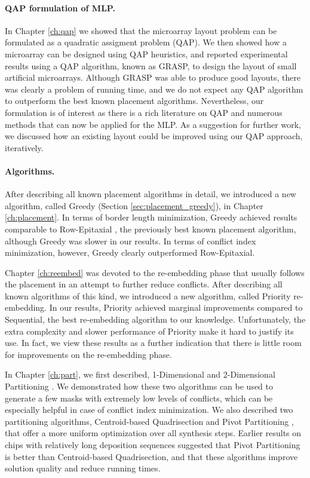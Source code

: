\paragraph{QAP formulation of MLP.} In Chapter \ref{ch:qap} we showed that the
microarray layout problem can be formulated as a quadratic assigment problem
(QAP). We then showed how a microarray can be designed using QAP heuristics, and
reported experimental results using a QAP algorithm, known as GRASP, to design
the layout of small artificial microarrays. Although GRASP was able to produce
good layouts, there was clearly a problem of running time, and we do not expect
any QAP algorithm to outperform the best known placement algorithms.
Nevertheless, our formulation is of interest as there is a rich literature on
QAP and numerous methods that can now be applied for the MLP. As a suggestion
for further work, we discussed how an existing layout could be improved using
our QAP approach, iteratively.

\paragraph{Algorithms.} After describing all known placement algorithms in
detail, we introduced a new algorithm, called Greedy (Section
\ref{sec:placement_greedy}), in Chapter \ref{ch:placement}. In terms of border
length minimization, Greedy achieved results comparable to Row-Epitaxial
\citep{Kahng2003}, the previously best known placement algorithm, although
Greedy was slower in our results. In terms of conflict index minimization,
however, Greedy clearly outperformed Row-Epitaxial.

Chapter \ref{ch:reembed} was devoted to the re-embedding phase that usually
follows the placement in an attempt to further reduce conflicts. After
describing all known algorithms of this kind, we introduced a new algorithm,
called Priority re-embedding. In our results, Priority achieved marginal
improvements compared to Sequential, the best re-embedding algorithm to our
knowledge. Unfortunately, the extra complexity and slower performance of
Priority make it hard to justify its use. In fact, we view these results as a
further indication that there is little room for improvements on the
re-embedding phase.

In Chapter \ref{ch:part}, we first described, 1-Dimensional and 2-Dimensional
Partitioning \citep{Carvalho2007}. We demonstrated how these two algorithms can
be used to generate a few masks with extremely low levels of conflicts, which
can be especially helpful in case of conflict index minimization. We also
described two partitioning algorithms, Centroid-based Quadrisection
\citep{Kahng2003a} and Pivot Partitioning \citep{Carvalho2006}, that offer a
more uniform optimization over all synthesis steps. Earlier results on chips
with relatively long deposition sequences suggested that Pivot Partitioning is
better than Centroid-based Quadrisection, and that these algorithms improve
solution quality and reduce running times.

